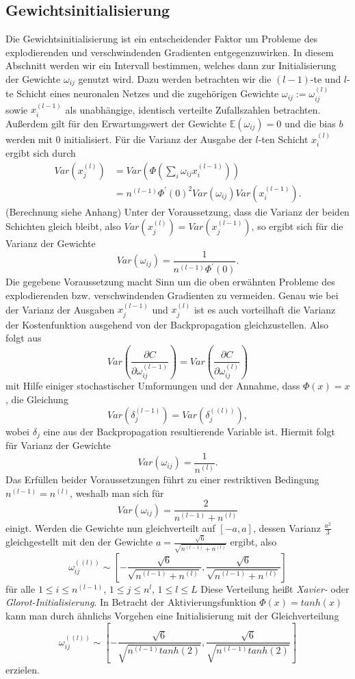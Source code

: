 \subsection{Gewichtsinitialisierung}
\label{subsec:gewichtsinitialisierung}
Die Gewichtsinitialisierung ist ein entscheidender Faktor um Probleme des explodierenden und verschwindenden Gradienten
entgegenzuwirken. In diesem Abschnitt werden wir ein Intervall bestimmen, welches dann zur Initialisierung der Gewichte
$\omega_{ij}$ genutzt wird. Dazu werden betrachten wir die $(l-1)$-te und $l$-te Schicht eines neuronalen Netzes und die
zugehörigen Gewichte $\omega_{ij}:=\omega_{ij}^{(l)}$ sowie $x_{i}^{(l-1)}$ als unabhängige, identisch verteilte
Zufallszahlen betrachten. Außerdem gilt für den Erwartungswert der Gewichte $\mathbb{E}(\omega_{ij})=0$ und die bias $b$
werden mit $0$ initialisiert. Für die Varianz der Ausgabe der $l$-ten Schicht $x_i^{(l)}$ ergibt sich durch
\begin{align*}
    Var(x_j^{(l)}) &= Var\left( \Phi\left( \sum_{i} \omega_{ij}x_i^{(l-1)} \right) \right)\\
    &= n^{(l-1)} \Phi^{\prime}(0)^2 Var(\omega_{ij}) Var(x_i^{(l-1)}).
\end{align*}
(Berechnung siehe Anhang) Unter der Voraussetzung, dass die Varianz der beiden Schichten gleich bleibt, also
$Var(x_j^{(l)})=Var(x_j^{(l-1)})$, so ergibt sich für die Varianz der Gewichte
\[
    Var(\omega_{ij}) = \frac{1}{n^{(l-1)}\Phi^{\prime}(0)}.
\]
Die gegebene Voraussetzung macht Sinn um die oben erwähnten Probleme des explodierenden bzw. verschwindenden Gradienten
zu vermeiden. Genau wie bei der Varianz der Ausgaben $x_j^{(l-1)}$ und $x_j^{(l)}$ ist es auch vorteilhaft die Varianz
der Kostenfunktion ausgehend von der Backpropagation gleichzustellen. Also folgt aus
\[
    Var(\frac{\partial C}{\partial \omega_{ij}^{(l-1)}}) = Var(\frac{\partial C}{\partial \omega_{ij}^{(l)}})
\]
mit Hilfe einiger stochastischer Umformungen und der Annahme, dass $\Phi(x)=x$, die Gleichung
\[
    Var(\delta_j^{(l-1)}) = Var(\delta_j^{((l))}),
\]
wobei $\delta_j$ eine aus der Backpropagation resultierende Variable ist. Hiermit folgt für Varianz der Gewichte
\[
    Var(\omega_{ij}) = \frac{1}{n^{(l)}}.
\]
Das Erfüllen beider Voraussetzungen führt zu einer restriktiven Bedingung $n^{(l-1)} = n^{(l)}$, weshalb man sich für
\[
    Var(\omega_{ij})= \frac{2}{n^{(l-1)} + n^{(l)}}
\]
einigt. Werden die Gewichte nun gleichverteilt auf $[-a,a]$, dessen Varianz $\frac{a^2}{3}$ gleichgestellt mit den der
Gewichte $a=\frac{\sqrt {6}}{\sqrt {n^{(l-1)} + n^{(l)}}}$ ergibt, also
\[
    \omega_{ij}^{((l))} \sim
    \left[ -\frac{\sqrt {6}}{\sqrt {n^{(l-1)} + n^{(l)}}}, \frac{\sqrt {6}}{\sqrt {n^{(l-1)} + n^{(l)}}} \right]
\]
für alle $1\leq i \leq n^{(l-1)}$, $1\leq j \leq n^{l}$, $1\leq l \leq L$ Diese Verteilung heißt \textit{Xavier-} oder
\textit{Glorot-Initialisierung}. In Betracht der Aktivierungsfunktion $\Phi(x)=tanh(x)$ kann man durch ähnlichs Vorgehen
eine Initialisierung mit der Gleichverteilung
\[
    \omega_{ij}^{((l))} \sim
    \left[ -\frac{\sqrt {6}}{\sqrt {n^{(l-1)} tanh(2)}}, \frac{\sqrt {6}}{\sqrt {n^{(l-1)} tanh(2)}} \right]
\]
erzielen.

